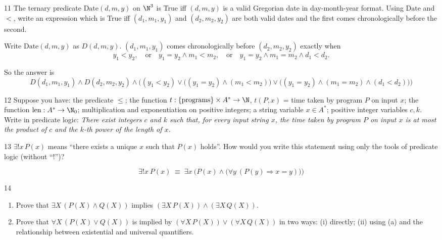 \begin{exercise}{11}
    The ternary predicate $\mathrm{Date}(d,m,y)$ on $\N^3$ is True iff
    $(d,m,y)$ is a valid Gregorian date in day-month-year format. Using
    $\mathrm{Date}$ and $<$, write an expression which is True iff
    $(d_1,m_1,y_1)$ and $(d_2,m_2,y_2)$ are both valid dates and the first comes
    chronologically before the second.
\end{exercise}
\begin{solbox}

\begin{solution}
Write $\text{Date}(d,m,y)$ as $D(d,m,y)$. $(d_1,m_1,y_1)$ comes
chronologically before $(d_2,m_2,y_2)$ exactly when
\[
y_1<y_2, \quad\text{or}\quad y_1=y_2 \wedge m_1<m_2, \quad\text{or}\quad y_1=y_2\wedge m_1=m_2\wedge d_1<d_2.
\]

So the answer is
\[
D(d_1,m_1,y_1)\wedge D(d_2,m_2,y_2)\wedge\Big((y_1<y_2)\vee\big((y_1=y_2)\wedge(m_1<m_2)\big)\vee\big((y_1=y_2)\wedge(m_1=m_2)\wedge(d_1<d_2)\big)\Big)
\]
\end{solution}
\end{solbox}

\begin{exercise}{12}
    Suppose you have: the predicate $\le$; the function
    $t:\{\text{programs}\}\times A^*\to\N$, $t(P,x)$ = time taken by program $P$
    on input $x$; the function $\mathrm{len}:A^*\to\N_0$; multiplication and
    exponentiation on positive integers; a string variable $x\in A^*$; positive
    integer variables $c,k$. Write in predicate logic:
    \emph{There exist integers $c$ and $k$ such that, for every input string $x$,
    the time taken by program $P$ on input $x$ is at most the product of $c$ and
    the $k$-th power of the length of $x$.}
\end{exercise}

\begin{exercise}{13}
    $\exists!x\,P(x)$ means ``there exists a unique $x$ such that $P(x)$
    holds''. How would you write this statement using only the tools of
    predicate logic (without ``!'')?
\end{exercise}
\begin{solbox}

\begin{solution}
\[
\exists! x\ P(x) \;\equiv\; \exists x\ \Big(P(x)\wedge\big(\forall y\ (P(y)\Rightarrow x=y)\big)\Big)
\]
\end{solution}
\end{solbox}

\begin{exercise}{14}
    \begin{enumerate}[label=(\alph*)]
        \item Prove that $\exists X\,(P(X)\wedge Q(X))$ implies
              $(\exists X\,P(X))\wedge(\exists X\,Q(X))$.
        \item Prove that $\forall X\,(P(X)\vee Q(X))$ is implied by
              $(\forall X\,P(X))\vee(\forall X\,Q(X))$ in two ways: (i) directly;
              (ii) using (a) and the relationship between existential and
              universal quantifiers.
    \end{enumerate}
\end{exercise}

